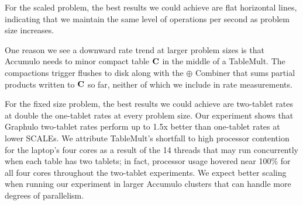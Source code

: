 For the scaled problem, the best results we could achieve are flat horizontal lines, 
indicating that we maintain the same level of operations per second as problem size increases.

One reason we see a downward rate trend at larger problem sizes is that Accumulo
needs to minor compact table $\mathbf{C}$ in the middle of a TableMult. 
The compactions trigger flushes to disk along with 
the $\oplus$ Combiner that sums partial products written to $\mathbf{C}$ so far, 
neither of which we include 
in rate measurements. %

For the fixed size problem, the best results we could achieve are two-tablet rates at
double the one-tablet rates at every problem size.
Our experiment shows that Graphulo two-tablet rates perform up to 1.5x better
than one-tablet rates at lower SCALEs. %
We attribute TableMult's shortfall to high processor contention for the laptop's four cores as a result of 
the 14 threads that may run concurrently when each table has two tablets; in fact,
processor usage hovered near 100\% for all four cores throughout the two-tablet experiments.
We expect better scaling when running our experiment 
in larger Accumulo clusters that can handle more degrees of parallelism.


